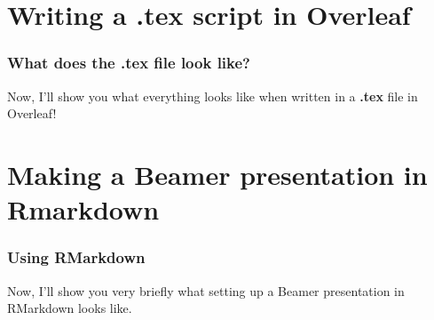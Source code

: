 \documentclass{beamer}
\begin{document}
\section{Writing a \textbf{.tex} script in Overleaf}


\begin{frame}
\frametitle{What does the \textbf{.tex} file look like?}

\hspace{1cm}

Now, I'll show you what everything looks like when written in a \textbf{.tex} file in Overleaf!

\end{frame}


\section{Making a Beamer presentation in Rmarkdown}


\begin{frame}
\frametitle{Using RMarkdown}

\hspace{1cm}

Now, I'll show you very briefly what setting up a Beamer presentation in RMarkdown looks like.

\end{frame}
\end{document}
